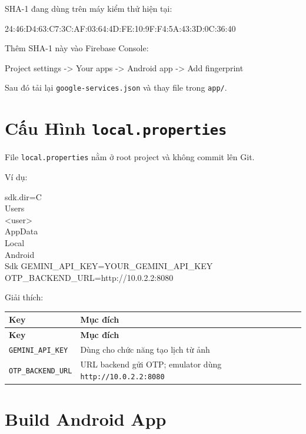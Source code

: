 \documentclass[12pt,a4paper]{report}
\begin{document}
SHA-1 đang dùng trên máy kiểm thử hiện tại:

\begin{CodeBlock}
24:46:D4:63:C7:3C:AF:03:64:4D:FE:10:9F:F4:5A:43:3D:0C:36:40
\end{CodeBlock}

Thêm SHA-1 này vào Firebase Console:

\begin{CodeBlock}
Project settings -> Your apps -> Android app -> Add fingerprint
\end{CodeBlock}

Sau đó tải lại \texttt{google-services.json} và thay file trong \texttt{app/}.

\section{Cấu Hình \texttt{local.properties}}

File \texttt{local.properties} nằm ở root project và không commit lên Git.

Ví dụ:

\begin{CodeBlock}
sdk.dir=C\:\\Users\\<user>\\AppData\\Local\\Android\\Sdk
GEMINI_API_KEY=YOUR_GEMINI_API_KEY
OTP_BACKEND_URL=http://10.0.2.2:8080
\end{CodeBlock}

Giải thích:

\begin{longtable}{|>{\raggedright\arraybackslash}p{}|>{\raggedright\arraybackslash}p{}|}
\hline
\textbf{Key} & \textbf{Mục đích} \\ \hline
\endfirsthead
\hline
\textbf{Key} & \textbf{Mục đích} \\ \hline
\endhead
\texttt{GEMINI\_API\_KEY} & Dùng cho chức năng tạo lịch từ ảnh \\ \hline
\texttt{OTP\_BACKEND\_URL} & URL backend gửi OTP; emulator dùng \texttt{http://10.0.2.2:8080} \\ \hline
\end{longtable}

\section{Build Android App}
\end{document}
